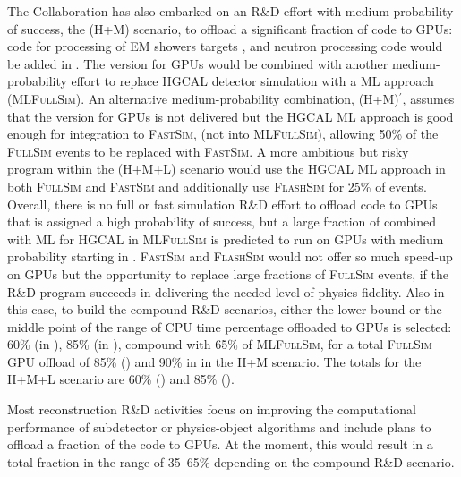 The \GEANTfour Collaboration has also embarked on an R\&D effort with medium probability of success, the (H+M) scenario, to offload a significant fraction of code to \glspl{GPU}: code for processing of \gls{EM} showers targets \RunFour, and neutron processing code would be added in \RunFive. The \GEANTfour version for \glspl{GPU} would be combined with another medium-probability effort to replace \gls{HGCAL} detector simulation with a \gls{ML} approach (\textsc{MLFullSim}). An alternative medium-probability combination, (H+M)$^\prime$, assumes that the \GEANTfour version for \glspl{GPU} is not delivered but the \gls{HGCAL} \gls{ML} approach is good enough for integration to \textsc{FastSim}, (not into \textsc{MLFullSim}), allowing 50\% of the \textsc{FullSim} events to be replaced with \textsc{FastSim}. A more ambitious but risky program within the (H+M+L) scenario would use the \gls{HGCAL} ML approach in both \textsc{FullSim} and \textsc{FastSim} and additionally use \textsc{FlashSim} for 25\% of events. Overall, there is no full or fast simulation R\&D effort to offload code to \glspl{GPU} that is assigned a high probability of success, but a large fraction of \GEANTfour combined with \gls{ML} for \gls{HGCAL} in \textsc{MLFullSim} is predicted to run on \glspl{GPU} with medium probability starting in \RunFour. \textsc{FastSim} and \textsc{FlashSim} would not offer so much speed-up on \glspl{GPU} but the opportunity to replace large fractions of \textsc{FullSim} events, if the R\&D program succeeds in delivering the needed level of physics fidelity. Also in this case, to build the compound R\&D scenarios, either the lower bound or the middle point of the range of \gls{CPU} time percentage offloaded to \glspl{GPU} is selected: 60\% (\GEANTfour in \RunFour), 85\% (\GEANTfour in \RunFive), compound with 65\% of \textsc{MLFullSim}, for a total \textsc{FullSim} \gls{GPU} offload of 85\% (\RunFour) and 90\% in \RunFive in the H+M scenario. The totals for the H+M+L scenario are 60\% (\RunFour) and 85\% (\RunFive). 

Most reconstruction R\&D activities focus on improving the computational performance of subdetector or physics-object algorithms and include plans to offload a fraction of the code to \glspl{GPU}. At the moment, this would result in a total fraction in the range of 35--65\% depending on the compound R\&D scenario.

